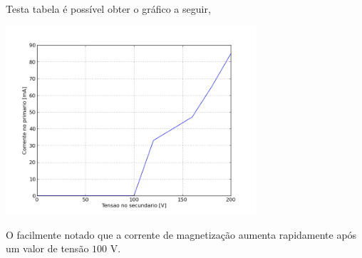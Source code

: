 \documentclass[conference]{IEEEtran}
\begin{document}
Testa tabela é possível obter o gráfico a seguir,
\begin{center}
    \setlength{\unitlength}{1mm}
    \includegraphics[height=7cm]{saturacao.png}
\end{center}

O facilmente notado que a corrente de magnetização aumenta rapidamente
após um valor de tensão $100$ V.


%
%

\end{document}
